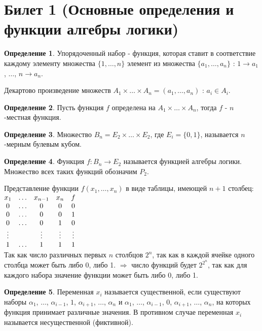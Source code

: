 \documentclass[a4paper, 12pt]{article}
\theoremstyle{definition}
\newtheorem*{definition}{Определение}
\theoremstyle{plain}
\theoremstyle{remark}
\begin{document}
  \tableofcontents
  \fontsize{14pt}{20pt}\selectfont
  \newpage
  \section{Билет 1 (Основные определения и функции алгебры логики)}
  \begin{definition}
    Упорядоченный набор - функция, которая ставит в соответствие каждому элементу множества $\{1, \ldots, n\}$ элемент из множества $\{a_1,\ldots,a_n\}$ : $1\rightarrow a_1$, $\ldots$, $n\rightarrow a_n$.
  \end{definition}
  Декартово произведение множеств $A_1\times\ldots\times A_n=(a_1, \ldots, a_n)$ : $a_i\in A_i$.
  \begin{definition}
    Пусть функция $f$ определена на $A_1\times\ldots\times A_n$, тогда $f$ - $n$-местная функция.
  \end{definition}
  \begin{definition}
    Множество $B_n=E_2\times\ldots\times E_2$, где $E_i=\{0,1\}$, называется $n$-мерным булевым кубом.
  \end{definition}
  \begin{definition}
    Функция $f:B_n \to E_2$ называется функцией алгебры логики. Множество всех таких функций обозначим $P_2$.
  \end{definition}
  Представление функции $f(x_1, \ldots, x_n)$ в виде таблицы, имеющей $n+1$ столбец:\\
  $\begin{matrix}
    x_1 & \ldots & x_{n-1} & x_n & f\\
    0 & \ldots & 0 & 0 & 0\\
    0 & \ldots & 0 & 0 & 1\\
    0 & \ldots & 0 & 1 & 0\\
    \vdots & \null & \vdots & \vdots & \vdots\\
    1 & \ldots & 1 & 1 & 1 
  \end{matrix}$\\
  Так как число различных первых $n$ столбцов $2^n$, так как в каждой ячейке одного столбца может быть либо 0, либо 1. $\Longrightarrow$ число функций будет $2^{2^n}$, так как для каждого набора значение функции может быть либо 0, либо 1.
  \begin{definition}
    Переменная $x_i$ называется существенной, если существуют наборы $\alpha_1$, $\ldots$, $\alpha_{i-1}$, $1$, $\alpha_{i+1}$, $\ldots$, $\alpha_n$ и $\alpha_1$, $\ldots$, $\alpha_{i-1}$, $0$, $\alpha_{i+1}$, $\ldots$, $\alpha_n$, на которых функция принимает различные значения. В противном случае переменная $x_i$ называется несущественной (фиктивной).
  \end{definition}
\end{document}
